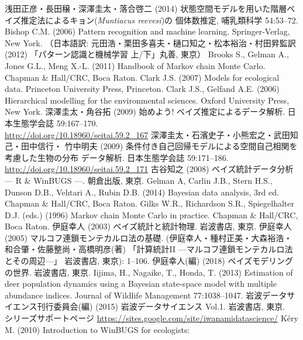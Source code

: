 \documentclass[11pt,uplatex]{jsarticle}
\begin{document}
\begin{thebibliography}{99}
 浅田正彦・長田穣・深澤圭太・落合啓二 (2014)
  状態空間モデルを用いた階層ベイズ推定法によるキョン(\textit{Muntiacus reevesi})の
  個体数推定, 哺乳類科学 54:53--72.
 Bishop C.M. (2006) Pattern recognition and machine learning.
  Springer-Verlag, New York.
  （日本語訳: 元田浩・栗田多喜夫・樋口知之・松本裕治・村田昇監訳 (2012)
  「パターン認識と機械学習 上/下」丸善, 東京）
 Brooks S., Gelman A., Jones G.L., Meng X.-L. (2011)
Handbook of Markov chain Monte Carlo. Chapman \& Hall/CRC, Boca Raton. 
 Clark J.S. (2007) Models for ecological data.
  Princeton University Press, Princeton.
 Clark J.S., Gelfand A.E. (2006) Hierarchical modelling
  for the environmental sciences. Oxford University Press, New York.
 深澤圭太・角谷拓 (2009) 始めよう! ベイズ推定によるデータ解析.
  日本生態学会誌 59:167--170.\\
  \url{http://doi.org/10.18960/seitai.59.2_167}
 深澤圭太・石濱史子・小熊宏之・武田知己・田中信行・
  竹中明夫 (2009) 条件付き自己回帰モデルによる空間自己相関を考慮した生物の分布
  データ解析. 日本生態学会誌 59:171--186. \\
  \url{http://doi.org/10.18960/seitai.59.2_171}
 古谷知之 (2008) ベイズ統計データ分析 --- R \& WinBUGS ---.
  朝倉出版, 東京.
 Gelman A, Carlin J.B., Stern H.S., Dunson D.B., Vehtari A.,
  Rubin D.B. (2014) Bayesian data analysis, 3rd ed.
  Chapman \& Hall/CRC, Boca Raton.
 Gilks W.R., Richardson S.R., Spiegelhalter D.J. (eds.) (1996)
  Markov chain Monte Carlo in practice. Chapman \& Hall/CRC, Boca Raton.
 伊庭幸人 (2003) ベイズ統計と統計物理. 岩波書店, 東京.
 伊庭幸人 (2005) マルコフ連鎖モンテカルロ法の基礎. 
  (伊庭幸人・種村正美・大森裕浩・和合肇・佐藤整尚・高橋明彦(著)
  「計算統計II ---マルコフ連鎖モンテカルロ法とその周辺---」
  岩波書店, 東京): 1--106.
 伊庭幸人(編) (2018) ベイズモデリングの世界. 岩波書店, 東京.
 Iijima, H., Nagaike, T., Honda, T. (2013) Estimation of
  deer population dynamics using a Bayesian state-space model with multiple
  abundance indices. Journal of Wildlife Management 77:1038--1047.
 岩波データサイエンス刊行委員会(編) (2015) 岩波データサイエンス Vol.1.
岩波書店, 東京. \\
シリーズサポートページ \url{https://sites.google.com/site/iwanamidatascience/}
 K\'ery M. (2010) Introduction to WinBUGS for ecologists:

\end{thebibliography}
\end{document}

